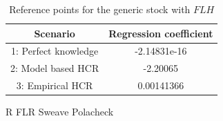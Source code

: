 \documentclass[a4paper]{article}
\begin{document}
\begin{table}
\centering
\begin{tabular}{|c|c|}
\hline
Scenario & Regression coefficient\\
\hline
1: Perfect knowledge & -2.14831e-16\\
2: Model based HCR   & -2.20065\\
3: Empirical HCR     & 0.00141366\\
\hline
\end{tabular}
\caption{Reference points for the generic stock with $FLH$}
\label{tab:genericRefPoints}
\end{table}



\newpage


R
FLR
Sweave
Polacheck
\end{document}
